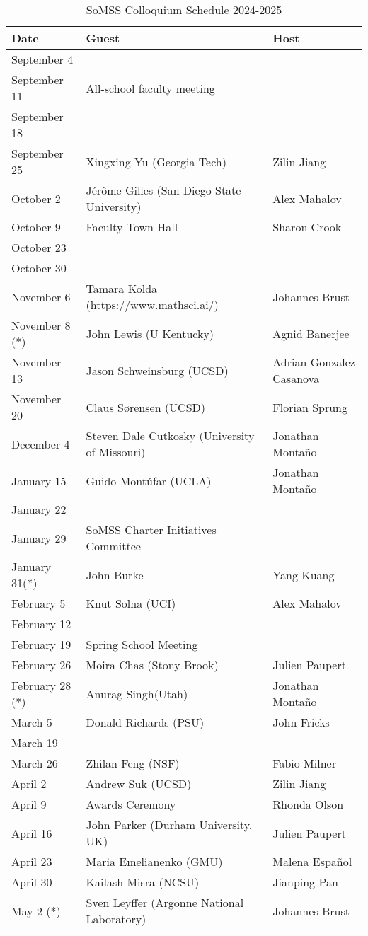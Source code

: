 \documentclass[11pt]{article}
\begin{document}
\begin{table}[htp]
\caption{SoMSS Colloquium Schedule 2024-2025}
\begin{center}
\begin{tabular}{|l|l|l|}
\hline
Date & Guest & Host\\
\hline
September 4 & & \\
September 11 & All-school faculty meeting & \\
September 18 & & \\
September 25 & Xingxing Yu (Georgia Tech) & Zilin Jiang\\
October 2 &J\'er\^ome Gilles (San Diego State University)& Alex Mahalov \\
October 9 & Faculty Town Hall & Sharon Crook\\
October 23 & & \\
October 30 & & \\
November 6 & Tamara Kolda (https://www.mathsci.ai/) & Johannes Brust\\
November 8 (*) & John Lewis (U Kentucky) & Agnid Banerjee\\
November 13 & Jason Schweinsburg (UCSD) & Adrian Gonzalez Casanova\\
November 20 &Claus S\o rensen (UCSD) & Florian Sprung \\
December 4 & Steven Dale Cutkosky (University of Missouri) & Jonathan Monta\~no \\
January 15 & Guido Mont\'ufar (UCLA) & Jonathan Monta\~no \\
January 22 & &\\
January 29 & SoMSS Charter Initiatives Committee &\\
January 31(*) & John Burke& Yang Kuang \\
February 5 & Knut Solna (UCI) & Alex Mahalov\\
February 12 & & \\
February 19 & Spring School Meeting & \\
February 26  & Moira Chas (Stony Brook) & Julien Paupert \\
February 28 (*) & Anurag Singh(Utah) & Jonathan Monta\~no\\
March 5 & Donald Richards (PSU) & John Fricks \\
March 19 & & \\
March 26 &Zhilan Feng (NSF) & Fabio Milner\\
April 2 & Andrew Suk (UCSD) & Zilin Jiang\\
April 9 & Awards Ceremony & Rhonda Olson\\
April 16 & John Parker (Durham University, UK)& Julien Paupert \\
April 23 &  Maria Emelianenko (GMU) & Malena Espa\~nol\\
April 30 & Kailash Misra  (NCSU) & Jianping Pan\\
May 2 (*)& Sven Leyffer (Argonne National Laboratory) & Johannes Brust\\
\hline
\end{tabular}
\end{center}
\end{table}%
\end{document}
